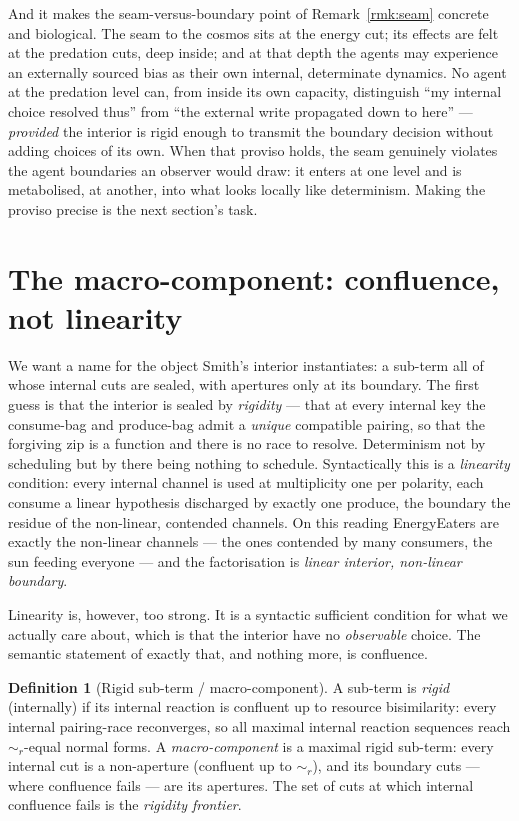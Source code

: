 \documentclass[11pt]{article}
\theoremstyle{definition}
\newtheorem{definition}{Definition}
\theoremstyle{plain}
\theoremstyle{remark}
\newcommand{\rbisim}{\sim_{r}}
\begin{document}
\noindent
And it makes the seam-versus-boundary point of Remark~\ref{rmk:seam} concrete and
biological. The seam to the cosmos sits at the energy cut; its effects are felt at
the predation cuts, deep inside; and at that depth the agents may experience an
externally sourced bias as their own internal, determinate dynamics. No agent at
the predation level can, from inside its own capacity, distinguish ``my internal
choice resolved thus'' from ``the external write propagated down to here'' ---
\emph{provided} the interior is rigid enough to transmit the boundary decision
without adding choices of its own. When that proviso holds, the seam genuinely
violates the agent boundaries an observer would draw: it enters at one level and is
metabolised, at another, into what looks locally like determinism. Making the
proviso precise is the next section's task.

\section{The macro-component: confluence, not linearity}\label{sec:macro}

We want a name for the object Smith's interior instantiates: a sub-term all of
whose internal cuts are sealed, with apertures only at its boundary. The first
guess is that the interior is sealed by \emph{rigidity} --- that at every internal
key the consume-bag and produce-bag admit a \emph{unique} compatible pairing, so
that the forgiving zip is a function and there is no race to resolve. Determinism
not by scheduling but by there being nothing to schedule. Syntactically this is a
\emph{linearity} condition: every internal channel is used at multiplicity one per
polarity, each consume a linear hypothesis discharged by exactly one produce, the
boundary the residue of the non-linear, contended channels. On this reading
\textsf{EnergyEaters} are exactly the non-linear channels --- the ones contended by
many consumers, the sun feeding everyone --- and the factorisation is
\emph{linear interior, non-linear boundary}.

Linearity is, however, too strong. It is a syntactic sufficient condition for what
we actually care about, which is that the interior have no \emph{observable} choice.
The semantic statement of exactly that, and nothing more, is confluence.

\begin{definition}[Rigid sub-term / macro-component]\label{def:macro}
A sub-term is \emph{rigid} (internally) if its internal reaction is confluent up to
resource bisimilarity: every internal pairing-race reconverges, so all maximal
internal reaction sequences reach $\rbisim$-equal normal forms. A
\emph{macro-component} is a maximal rigid sub-term: every internal cut is a
non-aperture (confluent up to $\rbisim$), and its boundary cuts --- where
confluence fails --- are its apertures. The set of cuts at which internal
confluence fails is the \emph{rigidity frontier}.
\end{definition}
\end{document}

